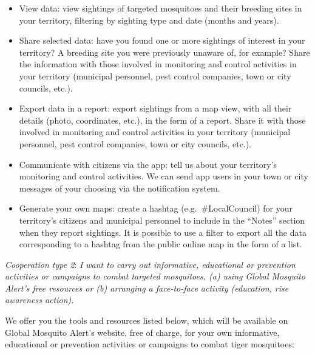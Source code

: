 \documentclass[]{article}
\providecommand{\tightlist}{%
  \setlength{\itemsep}{0pt}\setlength{\parskip}{0pt}}
\begin{document}
\begin{itemize}
\tightlist
\item
  View data: view sightings of targeted mosquitoes and their breeding sites in your territory, filtering by sighting type and date (months and years).
\item
  Share selected data: have you found one or more sightings of interest in your territory? A breeding site you were previously unaware of, for example? Share the information with those involved in monitoring and control activities in your territory (municipal personnel, pest control companies, town or city councils, etc.).
\item
  Export data in a report: export sightings from a map view, with all their details (photo, coordinates, etc.), in the form of a report. Share it with those involved in monitoring and control activities in your territory (municipal personnel, pest control companies, town or city councils, etc.).
\item
  Communicate with citizens via the app: tell us about your territory's monitoring and control activities. We can send app users in your town or city messages of your choosing via the notification system.
\item
  Generate your own maps: create a hashtag (e.g.~\#LocalCouncil) for your territory's citizens and municipal personnel to include in the ``Notes'' section when they report sightings. It is possible to use a filter to export all the data corresponding to a hashtag from the public online map in the form of a list.
\end{itemize}

\emph{Cooperation type 2}: \emph{I want to carry out informative, educational or prevention activities or campaigns to combat targeted mosquitoes, (a) using Global Mosquito Alert's free resources or (b) arranging a face-to-face activity (education, rise awareness action).}

We offer you the tools and resources listed below, which will be available on Global Mosquito Alert's website, free of charge, for your own informative, educational or prevention activities or campaigns to combat tiger mosquitoes:
\end{document}

